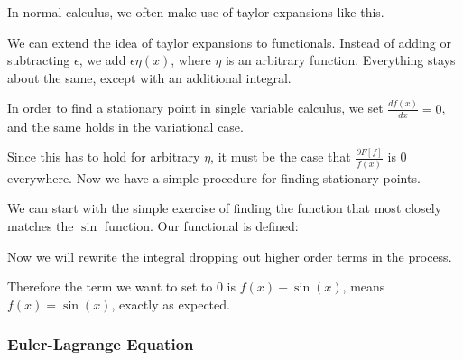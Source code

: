 \documentclass[12pt]{article}
\begin{document}
In normal calculus, we often make use of taylor expansions like this.


We can extend the idea of taylor expansions to functionals. Instead of adding or subtracting $\epsilon$, we add $\epsilon \eta(x)$, where $\eta$ is an arbitrary function. Everything stays about the same, except with an additional integral. 


In order to find a stationary point in single variable calculus, we set $\frac{df(x)}{dx} = 0$, and the same holds in the variational case.


Since this has to hold for arbitrary $\eta$, it must be the case that $\frac{\partial F[f]}{f(x)}$ is 0 everywhere. Now we have a simple procedure for finding stationary points.



We can start with the simple exercise of finding the function that most closely matches the $\sin$ function. Our functional is defined:


Now we will rewrite the integral dropping out higher order terms in the process.


Therefore the term we want to set to 0 is $f(x)-\sin(x)$, means $f(x) = \sin(x)$, exactly as expected.

\subsubsection{Euler-Lagrange Equation}
\end{document}
